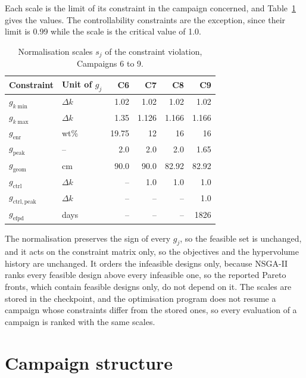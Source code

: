 Each scale is the limit of its constraint in the campaign concerned,
and Table~\ref{tab:cv-scales} gives the values. The controllability constraints are the exception, since their
limit is 0.99 while the scale is the critical value of 1.0.

\begin{table}[htbp]
  \centering
  \small
  \caption{Normalisation scales $s_j$ of the constraint violation, Campaigns 6 to 9.}
  \label{tab:cv-scales}
  \begin{tabular}{@{}l l r r r r@{}}
    \toprule
    Constraint & Unit of $g_j$ & C6 & C7 & C8 & C9 \\
    \midrule
    $g_{k\min}$            & $\Delta k$ & 1.02  & 1.02  & 1.02  & 1.02  \\
    $g_{k\max}$            & $\Delta k$ & 1.35  & 1.126 & 1.166 & 1.166 \\
    $g_\mathrm{enr}$       & wt\%       & 19.75 & 12    & 16    & 16    \\
    $g_\mathrm{peak}$      & --         & 2.0   & 2.0   & 2.0   & 1.65  \\
    $g_\mathrm{geom}$      & cm         & 90.0  & 90.0  & 82.92 & 82.92 \\
    $g_\mathrm{ctrl}$      & $\Delta k$ & --    & 1.0   & 1.0   & 1.0   \\
    $g_\mathrm{ctrl,peak}$ & $\Delta k$ & --    & --    & --    & 1.0   \\
    $g_\mathrm{efpd}$      & days       & --    & --    & --    & 1826  \\
    \bottomrule
  \end{tabular}
\end{table}

The normalisation preserves the sign of every $g_j$, so the feasible
set is unchanged, and it acts on the constraint matrix only, so the
objectives and the hypervolume history are unchanged. It orders the
infeasible designs only, because NSGA-II ranks every feasible design
above every infeasible one, so the reported Pareto fronts, which contain
feasible designs only, do not depend on it. The scales are stored in the
checkpoint, and the optimisation program does not resume a campaign
whose constraints differ from the stored ones, so every evaluation of a
campaign is ranked with the same scales.

\section{Campaign structure}
\label{sec:meth-campaigns}

